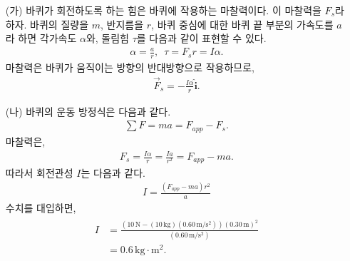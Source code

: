 \documentclass[floatfix,nofootinbib,superscriptaddress,fleqn]{revtex4-2}
\begin{document}
\begin{itemize}
  \item[(가)] 바퀴가 회전하도록 하는 힘은 바퀴에 작용하는 마찰력이다.
  이 마찰력을 $F_s$라 하자.
  바퀴의 질량을 $m$, 반지름을 $r$, 바퀴 중심에 대한 바퀴 끝 부분의 가속도를 
  $a$라 하면
  각가속도 $\alpha$와, 돌림힘 $\tau$를 다음과 같이 표현할 수 있다.
  \begin{align}
    \alpha=\frac{a}{r},\,\,\, \tau = F_s r = I\alpha.
  \end{align}
  마찰력은 바퀴가 움직이는 방향의 반대방향으로 작용하므로,
  \begin{align}
    \vec{F}_s = -\frac{I\alpha}{r}\hat{\bm i}.
  \end{align}
  \item[(나)]
  바퀴의 운동 방정식은 다음과 같다.
  \begin{align}
    \sum F = ma = F_{app} - F_s.
  \end{align}
  마찰력은,
  \begin{align}
    F_s=\frac{I\alpha}{r} = \frac{Ia}{r^2} = F_{app}-ma.
  \end{align}
따라서 회전관성 $I$는 다음과 같다.
\begin{align}
  I = \frac{(F_{app}-ma)r^2}{a}
\end{align}
  수치를 대입하면,
  \begin{align}
    \begin{split}
      I &= \frac{(10\,\mathrm{N} - (10\,\mathrm{kg})(0.60\,\mathrm{m/s^2}))
      (0.30\,\mathrm{m})^2}{(0.60\,\mathrm{m/s^2})} \\
      &=0.6\,\mathrm{kg\cdot m^2}.
    \end{split}
  \end{align}
\end{itemize}

\vspace{1.cm}
\end{document}
